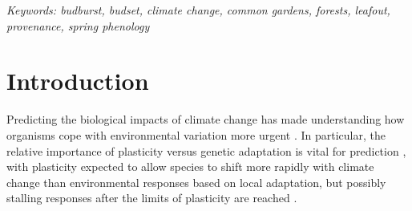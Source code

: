 \documentclass{article}
\begin{document}
\noindent \emph{Keywords: budburst, budset, climate change, common gardens, forests, leafout, provenance, spring phenology}\\


\section{Introduction}


Predicting the biological impacts of climate change has made understanding how organisms cope with environmental variation more urgent \citep{botero15}. In particular, the relative importance of plasticity versus genetic adaptation is vital for prediction \citep{chevin10}, with plasticity expected to allow species to shift more rapidly with climate change than environmental responses based on local adaptation, but possibly stalling responses after the limits of plasticity are reached \citep{chevin102,snell18}.

\end{document}
